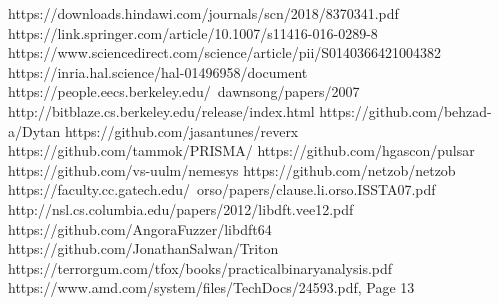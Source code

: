 \documentclass[conference]{IEEEtran}
\begin{document}
\begin{thebibliography}{00}
     https://downloads.hindawi.com/journals/scn/2018/8370341.pdf
     https://link.springer.com/article/10.1007/s11416-016-0289-8
     https://www.sciencedirect.com/science/article/pii/S0140366421004382
     https://inria.hal.science/hal-01496958/document
     https://people.eecs.berkeley.edu/~dawnsong/papers/2007%
     http://bitblaze.cs.berkeley.edu/release/index.html
     https://github.com/behzad-a/Dytan
     https://github.com/jasantunes/reverx
     https://github.com/tammok/PRISMA/
     https://github.com/hgascon/pulsar
     https://github.com/vs-uulm/nemesys
     https://github.com/netzob/netzob
     https://faculty.cc.gatech.edu/~orso/papers/clause.li.orso.ISSTA07.pdf
     http://nsl.cs.columbia.edu/papers/2012/libdft.vee12.pdf
     https://github.com/AngoraFuzzer/libdft64
     https://github.com/JonathanSalwan/Triton
     https://terrorgum.com/tfox/books/practicalbinaryanalysis.pdf
     https://www.amd.com/system/files/TechDocs/24593.pdf, Page 13

\end{thebibliography}
\vspace{12pt}
\end{document}
